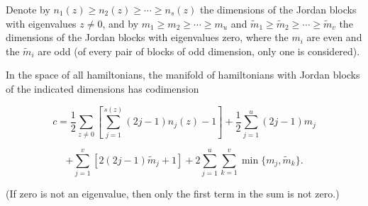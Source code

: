 Denote by $n_1(z) \geq n_2(z) \geq \cdots \geq n_s(z)$ the dimensions of the Jordan blocks with eigenvalues $z \neq 0$, and by $m_1 \geq m_2 \geq \cdots \geq m_u$ and $\tilde{m}_1 \geq \tilde{m}_2 \geq \cdots \geq \tilde{m}_v$ the dimensions of the Jordan blocks with eigenvalues zero, where the $m_i$ are even and the $\tilde{m}_i$ are odd (of every pair of blocks of odd dimension, only one is considered).

In the space of all hamiltonians, the manifold of hamiltonians with Jordan blocks of the indicated dimensions has codimension

$$c = \frac{1}{2} \sum_{z \neq 0} \left[ \sum_{j=1}^{s(z)} (2j-1)n_j(z) - 1 \right] + \frac{1}{2} \sum_{j=1}^{u} (2j-1)m_j$$

$$+ \sum_{j=1}^{v} [2(2j-1)\tilde{m}_j + 1] + 2 \sum_{j=1}^{u} \sum_{k=1}^{v} \min\{m_j, \tilde{m}_k\}.$$

(If zero is not an eigenvalue, then only the first term in the sum is not zero.)
